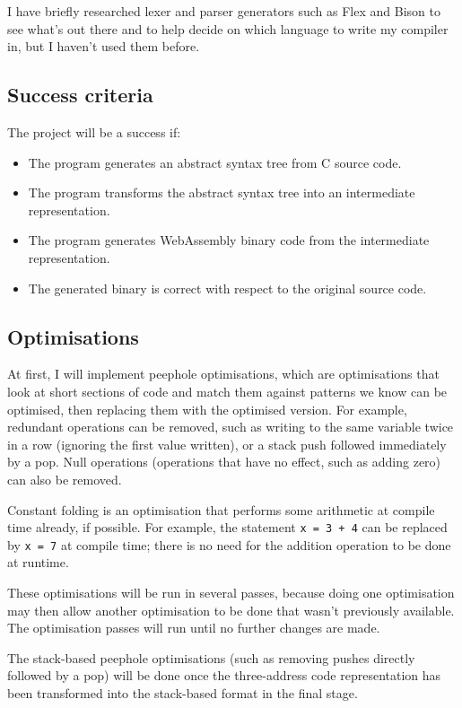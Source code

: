 \documentclass[12pt,a4paper]{article}
\begin{document}
I have briefly researched lexer and parser generators such as Flex and Bison to see what's out there and to help decide on which language to write my compiler in, but I haven't used them before.

\subsection*{Success criteria}

The project will be a success if:

\begin{itemize}
\item The program generates an abstract syntax tree from C source code.
\item The program transforms the abstract syntax tree into an intermediate representation.
\item The program generates WebAssembly binary code from the intermediate representation.
\item The generated binary is correct with respect to the original source code.
\end{itemize}


\subsection*{Optimisations}

At first, I will implement peephole optimisations, which are optimisations that look at short sections of code and match them against patterns we know can be optimised, then replacing them with the optimised version.
For example, redundant operations can be removed, such as writing to the same variable twice in a row (ignoring the first value written), or a stack push followed immediately by a pop.
Null operations (operations that have no effect, such as adding zero) can also be removed.

Constant folding is an optimisation that performs some arithmetic at compile time already, if possible. For example, the statement \texttt{x = 3 + 4} can be replaced by \texttt{x = 7} at compile time; there is no need for the addition operation to be done at runtime.

These optimisations will be run in several passes, because doing one optimisation may then allow another optimisation to be done that wasn't previously available. The optimisation passes will run until no further changes are made.

The stack-based peephole optimisations (such as removing pushes directly followed by a pop) will be done once the three-address code representation has been transformed into the stack-based format in the final stage.
\end{document}
